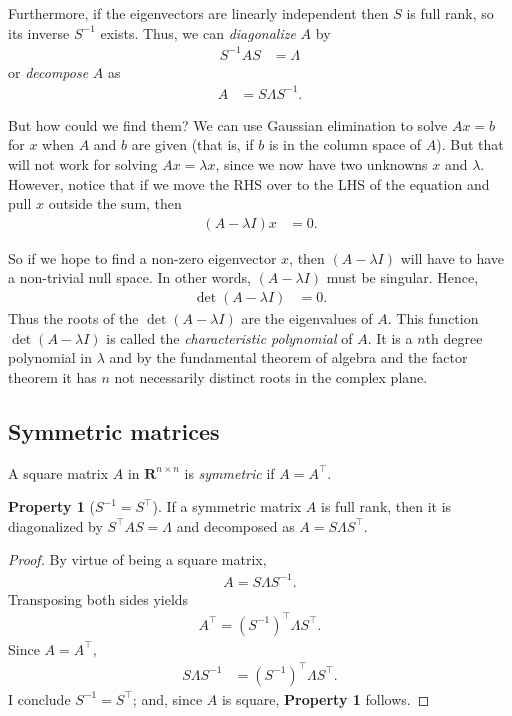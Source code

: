 \documentclass[]{article}
\theoremstyle{plain}
\theoremstyle{definition}
\newtheorem{property}{Property}
\theoremstyle{remark}
\newcommand{\reals}{\mathbf{R}}
\begin{document}
Furthermore, if the eigenvectors are linearly independent then $S$ is full
rank, so its inverse $S^{-1}$ exists. Thus, we can \emph{diagonalize} $A$ by
\begin{align*}
S^{-1} A S &= \Lambda 
\end{align*}
or \emph{decompose} $A$ as
\begin{align*}
A &= S\Lambda S^{-1}.
\end{align*}

But how could we find them?  We can use Gaussian elimination to solve
$Ax = b$ for $x$ when $A$ and $b$ are given (that is, if $b$ is in the column
space of $A$).  But that will not work for solving $Ax = \lambda x$,
since we now have two unknowns $x$ and $\lambda$. However, notice that
if we move the RHS over to the LHS of the equation and pull $x$ outside
the sum, then
\begin{align*}
(A -  \lambda I)x &= 0.
\end{align*}

So if we hope to find a non-zero eigenvector $x$, then $(A -  \lambda I)$
will have to have a non-trivial null space. In other words, $(A -  \lambda I)$
must be singular.  Hence,
\begin{align*}
\det{(A -  \lambda I)} &= 0.
\end{align*}
Thus the roots of the $\det{(A -  \lambda I)}$ are the eigenvalues of $A$.
This function $\det{(A -  \lambda I)}$ is called the \emph{characteristic
polynomial} of $A$.  It is a $n$th degree polynomial in $\lambda$ and
by the fundamental theorem of algebra and the factor theorem it has
$n$ not necessarily distinct roots in the complex plane.

\subsection{Symmetric matrices}\label{symmetric-matrices}

A square matrix $A$ in $\reals^{n \times n}$ is \emph{symmetric} if
$A = A^\top$.

\begin{property}[$S^{-1} =  S^\top$]
If a symmetric matrix $A$ is full rank, then it is diagonalized by
$S^\top AS = \Lambda$ and decomposed as $A = S\Lambda S^\top$. 
\end{property}
\begin{proof}
By virtue of being a square matrix,
\begin{align*}
A = S\Lambda S^{-1}.
\end{align*}
Transposing both sides yields
\begin{align*}
A^\top = (S^{-1})^\top \Lambda S^\top.
\end{align*}
Since $A = A^\top$,
\begin{align*}
S\Lambda S^{-1} &=  (S^{-1})^\top \Lambda S^\top.
\end{align*}
I conclude $S^{-1} = S^\top$; and, since $A$ is square,
\textbf{Property 1} follows.
\end{proof}
\end{document}
